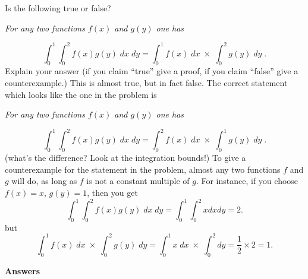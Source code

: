 \documentclass[11pt]{amsart}
\begin{document}
\problem Is the following true or false? %
\begin{center}
  \textit{For any two functions $f(x)$ and $g(y)$ one has}
\end{center}
\[
\int_0^1 \int_0^2 f(x) g(y) \; dx\; dy
= 
\int_0^1 f(x) \; dx\; \times\; 
\int_0^2 g(y)\; dy\; .
\]
Explain your answer (if you claim ``true'' give a proof, if you claim
``false'' give a counterexample.)
\answer
This is almost true, but in fact false.  The correct statement which
looks like the one in the problem is
\begin{center}
  \textit{For any two functions $f(x)$ and $g(y)$ one has}
\end{center}
\[
\int_0^1 \int_0^2 f(x) g(y) \; dx\; dy
= 
\int_0^2 f(x) \; dx\; \times\; 
\int_0^1 g(y)\; dy\; .
\]
(what's the difference?  Look at the integration bounds!)
To give a counterexample for the statement in the problem, almost any
two functions $f$ and $g$ will do, as long as $f$ is not a constant multiple of
$g$.  For instance, if you choose $f(x) = x$, $g(y)=1$, then you get
\[
\int_0^1 \int_0^2 f(x) g(y) \; dx\; dy= \int_0^1\int_0^2 xdx dy = 2.
\]
but
\[
\int_0^1 f(x) \; dx\; \times\; 
\int_0^2 g(y)\; dy
=
\int_0^1 x \; dx\; \times\; 
\int_0^2  dy
=
\frac{1}{2}\times2 = 1.
\]
\endanswer

\newpage
\immediate\closeout\ans
\begin{center}
  \bfseries Answers
\end{center}

\bigskip
\begin{trivlist}

\end{trivlist}
\end{document}
